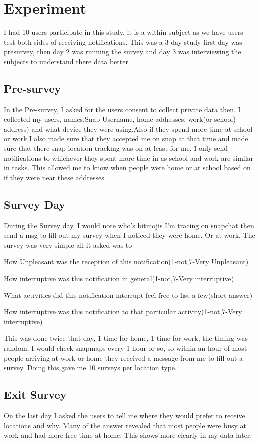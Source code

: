 \documentclass{vgtc}                          %
\begin{document}
\section{Experiment}
I had 10 users participate in this study, it is a within-subject as we have users test both sides of receiving notifications. This was a 3 day study first day was presurvey, then day 2 was running the survey and day 3 was interviewing the subjects to understand there data better.
\subsection{Pre-survey}
In the Pre-survey, I asked for the users consent to collect private data then. I collected my users, names,Snap Username, home addresses, work(or school) address) and what device they were using.Also if they spend more time at school or work.I also made sure that they accepted me on snap at that time and made sure that there snap location tracking was on at least for me. I only send notifications to whichever they spent more time in as school and work are similar in tasks. This allowed me to know when people were home or at school based on if they were near these addresses. 
\subsection{Survey Day}
During the Survey day, I would note who’s bitmojis I’m tracing on snapchat then send a msg to fill out my survey when I noticed they were home. Or at work. The survey was very simple all it asked was to\item
How Unpleasant was the reception of this notification(1-not,7-Very Unpleasant)\item
How interruptive was this notification in general(1-not,7-Very interruptive)\item
What activities did this notification interrupt feel free to list a few(short answer)\item
How interruptive was this notification to that particular activity(1-not,7-Very interruptive)

This was done twice that day, 1 time for home, 1 time for work, the timing was random. I would check snapmaps every 1 hour or so, so within an hour of most people arriving at work or home they received a message from me to fill out a survey. Doing this gave me 10 surveys per location type. 
\subsection{Exit Survey}
On the last day I asked the users to tell me where they would prefer to receive locations and why. Many of the answer revealed that most people were busy at work and had more free time at home. This shows more clearly in my data later. 
\end{document}
